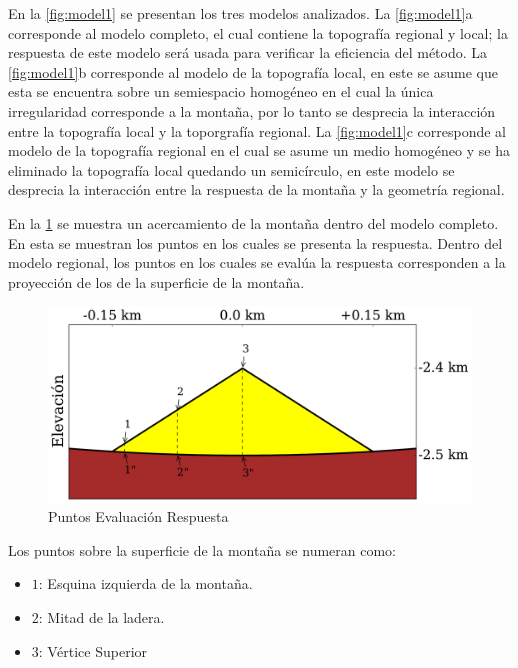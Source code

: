 \documentclass[spanish,letterpaper,12pt,twoside,openany]{article}
\begin{document}
En la \cref{fig:model1} se presentan los tres modelos analizados. La \cref{fig:model1}a corresponde al modelo completo, el cual contiene la topografía regional y local; la respuesta de este modelo será usada para verificar la eficiencia del método. La \cref{fig:model1}b corresponde al modelo de la topografía local, en este se asume que esta se encuentra sobre un semiespacio homogéneo en el cual la única irregularidad corresponde a la montaña, por lo tanto se desprecia la interacción entre la topografía local y la toporgrafía regional. La \cref{fig:model1}c corresponde al modelo de la topografía regional en el cual se asume un medio homogéneo y se ha eliminado la topografía local quedando un semicírculo, en este modelo se desprecia la interacción entre la respuesta de la montaña y la geometría regional. %

En la \cref{fig:puntos} se muestra un acercamiento de la montaña dentro del modelo completo. En esta se muestran los puntos en los cuales se presenta la respuesta. Dentro del modelo regional, los puntos en los cuales se evalúa la respuesta corresponden a la proyección de los de la superficie de la montaña.

\begin{figure}[H]
	\centering
	\includegraphics[width=12 cm]{img/ModelRegionalCompleteZoom.pdf}
	\vspace{-.5 cm}
	\caption{Puntos Evaluación Respuesta}
	\label{fig:puntos}
	\vspace{-1 cm}
\end{figure}
%

Los puntos sobre la superficie de la montaña se numeran como:
%
\begin{itemize}
%
	\item $1$: Esquina izquierda de la montaña.
	\item $2$: Mitad de la ladera.
	\item $3$: Vértice Superior
	\vspace{-.5 cm}
%
\end{itemize} 
\end{document}
